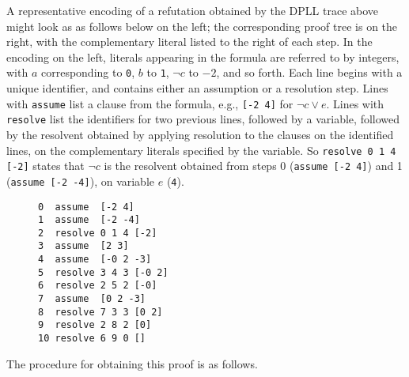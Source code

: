 \documentclass[11pt]{article}
\begin{document}
A representative encoding of a refutation obtained by the DPLL trace above might look as as follows below on the left; the corresponding proof tree is on the right, with the complementary literal listed to the right of each step.
In the encoding on the left, literals appearing in the formula are referred to by integers, with $a$ corresponding to \verb'0', $b$ to \verb'1', $\lnot c$ to $-2$, and so forth.
Each line begins with a unique identifier, and contains either an assumption or a resolution step.
Lines with \verb'assume' list a clause from the formula, e.g., \verb'[-2 4]' for $\lnot c \lor e$.
Lines with \verb'resolve' list the identifiers for two previous lines, followed by a variable, followed by the resolvent obtained by applying resolution to the clauses on the identified lines, on the complementary literals specified by the variable.
So \verb'resolve 0 1 4 [-2]' states that $\lnot c$ is the resolvent obtained from steps 0 (\verb'assume [-2 4]') and 1 (\verb'assume [-2 -4]'), on variable $e$ (\verb'4').

\begin{figure}[h!]
\small
\begin{minipage}{0.32\textwidth}
\begin{lstlisting}
0  assume  [-2 4]
1  assume  [-2 -4]
2  resolve 0 1 4 [-2]
3  assume  [2 3]
4  assume  [-0 2 -3]
5  resolve 3 4 3 [-0 2]
6  resolve 2 5 2 [-0]
7  assume  [0 2 -3]
8  resolve 7 3 3 [0 2]
9  resolve 2 8 2 [0]
10 resolve 6 9 0 []
\end{lstlisting}
\end{minipage}
\hspace*{1em}
\end{figure}
The procedure for obtaining this proof is as follows.
\end{document}
